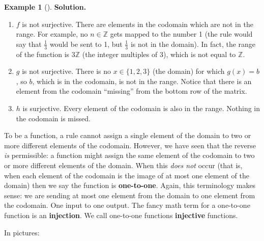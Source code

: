 \documentclass[10pt,]{book}
\newcommand{\terminology}[1]{\textbf{#1}}
\theoremstyle{plain}
\theoremstyle{definition}
\theoremstyle{definition}
\newtheorem{example}[theorem]{Example}
\theoremstyle{definition}
\numberwithin{equation}{chapter}
\def\Z{\mathbb Z}
\begin{document}
\begin{example}[]
\noindent\textbf{Solution.}\hypertarget{solution-252}{}\quad%
\hypertarget{p-2129}{}%
\leavevmode%
\begin{enumerate}
\item\hypertarget{li-375}{}\(f\) is not surjective. There are elements in the codomain which are not in the range. For example, no \(n \in \Z\) gets mapped to the number 1 (the rule would say that \(\frac{1}{3}\) would be sent to 1, but \(\frac{1}{3}\) is not in the domain). In fact, the range of the function is \(3\Z\) (the integer multiples of 3), which is not equal to \(\Z\).%
\item\hypertarget{li-376}{}\(g\) is not surjective. There is no \(x \in \{1,2,3\}\) (the domain) for which \(g(x) = b\), so \(b\), which is in the codomain, is not in the range. Notice that there is an element from the codomain ``missing'' from the bottom row of the matrix.%
\item\hypertarget{li-377}{}\(h\) is surjective. Every element of the codomain is also in the range. Nothing in the codomain is missed.%
\end{enumerate}
%
\end{example}
\hypertarget{p-2130}{}%
To be a function, a rule cannot assign a single element of the domain to two or more different elements of the codomain. However, we have seen that the reverse \emph{is} permissible: a function might assign the same element of the codomain to two or more different elements of the domain. When this \emph{does not} occur (that is, when each element of the codomain is the image of at most one element of the domain) then we say the function is \terminology{one-to-one}. Again, this terminology makes sense: we are sending at most one element from the domain to one element from the codomain. One input to one output. The fancy math term for a one-to-one function is an \terminology{injection}. We call one-to-one functions \terminology{injective} functions.%
\par
\hypertarget{p-2131}{}%
In pictures:%
\end{document}
